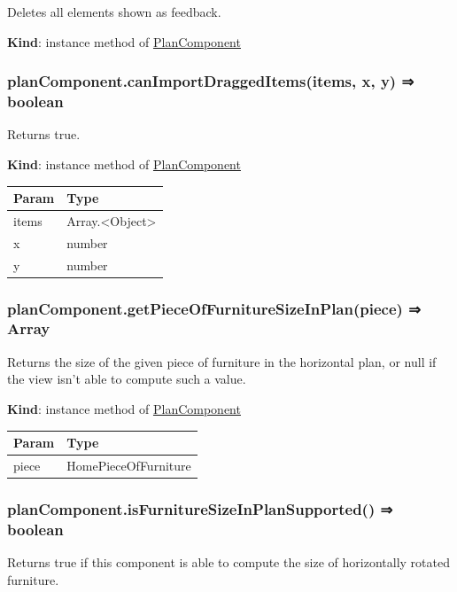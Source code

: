 \documentclass[a4paper]{report}
\begin{document}
Deletes all elements shown as feedback.

\textbf{Kind}: instance method of
\protect\hyperlink{PlanComponent}{PlanComponent}\\

\hypertarget{plancomponent.canimportdraggeditemsitems-x-y-boolean}{%
\subsubsection{planComponent.canImportDraggedItems(items, x, y) ⇒
boolean}\label{plancomponent.canimportdraggeditemsitems-x-y-boolean}}

Returns true.

\textbf{Kind}: instance method of
\protect\hyperlink{PlanComponent}{PlanComponent}

\begin{longtable}[]{@{}ll@{}}
\toprule
Param & Type\tabularnewline
\midrule
\endhead
items & Array.\textless Object\textgreater{}\tabularnewline
x & number\tabularnewline
y & number\tabularnewline
\bottomrule
\end{longtable}

\hypertarget{plancomponent.getpieceoffurnituresizeinplanpiece-array}{%
\subsubsection{planComponent.getPieceOfFurnitureSizeInPlan(piece) ⇒
Array}\label{plancomponent.getpieceoffurnituresizeinplanpiece-array}}

Returns the size of the given piece of furniture in the horizontal plan,
or null if the view isn't able to compute such a value.

\textbf{Kind}: instance method of
\protect\hyperlink{PlanComponent}{PlanComponent}

\begin{longtable}[]{@{}ll@{}}
\toprule
Param & Type\tabularnewline
\midrule
\endhead
piece & HomePieceOfFurniture\tabularnewline
\bottomrule
\end{longtable}

\hypertarget{plancomponent.isfurnituresizeinplansupported-boolean}{%
\subsubsection{planComponent.isFurnitureSizeInPlanSupported() ⇒
boolean}\label{plancomponent.isfurnituresizeinplansupported-boolean}}

Returns true if this component is able to compute the size of
horizontally rotated furniture.
\end{document}
